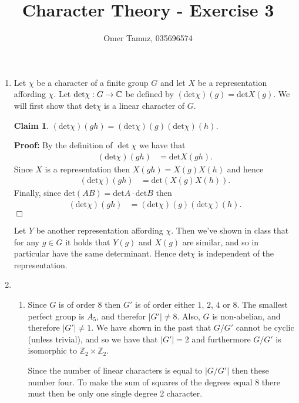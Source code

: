\documentclass[11pt]{article} \usepackage{amssymb}
\newtheorem{claim}[theorem]{Claim}
\newenvironment{proof}{\noindent \textbf{Proof:}}{$\Box$}
\newcommand{\Z}{\mathbb Z} \newcommand{\CalE}{{\mathcal{E}}}
\newcommand{\de}{\mathrm{det}}
\begin{document}
\title{Character Theory - Exercise 3}

 \author{Omer Tamuz, 035696574}
\maketitle

\begin{enumerate}
\item Let $\chi$ be a character of a finite group $G$ and let $X$ be a
  representation affording $\chi$.  Let $\de \chi:G \to \C$ be defined
  by $(\de\chi)(g) = \de X(g)$. We will first show that $\de\chi$ is a
  linear character of $G$.
  \begin{claim}
    $(\de\chi)(gh) = (\de\chi)(g)(\de\chi)(h)$.
  \end{claim}
  \begin{proof}
    By the definition of $\det\chi$ we have that
    \begin{align*}
      (\de\chi)(gh) &= \de X(gh).
    \end{align*}
    Since $X$ is a representation then $X(gh)=X(g)X(h)$ and hence 
    \begin{align*}
      (\de\chi)(gh) &= \de (X(g)X(h)).
    \end{align*}
    Finally, since $\de (AB) = \de A \cdot \de B$ then
    \begin{align*}
      (\de\chi)(gh) &= (\de\chi)(g)(\de\chi)(h).      
    \end{align*}
  \end{proof}
  
  Let $Y$ be another representation affording $\chi$. Then we've shown
  in class that for any $g \in G$ it holds that $Y(g)$ and $X(g)$ are
  similar, and so in particular have the same determinant. Hence
  $\de\chi$ is independent of the representation.
\item
  \begin{enumerate}
  \item 

    Since $G$ is of order 8 then $G'$ is of order either $1$, $2$, $4$
    or $8$. The smallest perfect group is $A_5$, and therefor $|G'|
    \neq 8$. Also, $G$ is non-abelian, and therefore $|G'| \neq 1$. We
    have shown in the past that $G/G'$ cannot be cyclic (unless
    trivial), and so we have that $|G'|=2$ and furthermore $G/G'$ is
    isomorphic to $\Z_2 \times \Z_2$.

    Since the number of linear characters is equal to $|G/G'|$ then
    these number four. To make the sum of squares of the degrees equal
    8 there must then be only one single degree 2 character.


\end{enumerate}
\end{enumerate}
\end{document}
